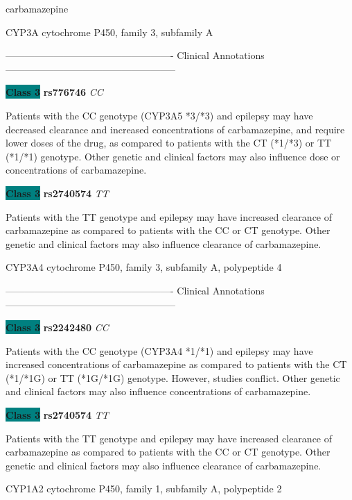 \documentclass{resume} %
\begin{document}
\begin{rSection}{ carbamazepine }
\begin{rSubsection}{ CYP3A }{ cytochrome P450, family 3, subfamily A }{}{}
\item[] ---------------------------------------------------- Clinical Annotations -----------------------------------------------------\newline
\item \textbf{\colorbox{teal} {Class 3}} \textbf{ rs776746 } \textit{ CC }
\item[] Patients with the CC genotype (CYP3A5 *3/*3) and epilepsy may have decreased clearance and increased concentrations of carbamazepine, and require lower doses of the drug, as compared to patients with the CT (*1/*3) or TT (*1/*1) genotype. Other genetic and clinical factors may also influence dose or concentrations of carbamazepine.\item \textbf{\colorbox{teal} {Class 3}} \textbf{ rs2740574 } \textit{ TT }
\item[] Patients with the TT genotype and epilepsy may have increased clearance of carbamazepine as compared to patients with the CC or CT genotype. Other genetic and clinical factors may also influence clearance of carbamazepine.
\end{rSubsection}\begin{rSubsection}{ CYP3A4 }{ cytochrome P450, family 3, subfamily A, polypeptide 4 }{}{}
\item[]

\item[] ---------------------------------------------------- Clinical Annotations -----------------------------------------------------\newline
\item \textbf{\colorbox{teal} {Class 3}} \textbf{ rs2242480 } \textit{ CC }
\item[] Patients with the CC genotype (CYP3A4 *1/*1) and epilepsy may have increased concentrations of carbamazepine as compared to patients with the CT (*1/*1G) or TT (*1G/*1G) genotype. However, studies conflict. Other genetic and clinical factors may also influence concentrations of carbamazepine.\item \textbf{\colorbox{teal} {Class 3}} \textbf{ rs2740574 } \textit{ TT }
\item[] Patients with the TT genotype and epilepsy may have increased clearance of carbamazepine as compared to patients with the CC or CT genotype. Other genetic and clinical factors may also influence clearance of carbamazepine.
\end{rSubsection}\begin{rSubsection}{ CYP1A2 }{ cytochrome P450, family 1, subfamily A, polypeptide 2 }{}{}
\item[]


\end{rSubsection}
\end{rSection}
\end{document}
